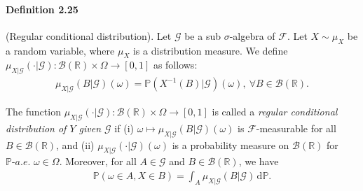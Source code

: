 \documentclass{article}
\numberwithin{equation}{section}
\renewcommand{\P}{\mathbb{P}}
\renewcommand{\d}{\mathrm{d}}
\theoremstyle{plain}
\theoremstyle{definition}
\begin{document}
\paragraph{Definition 2.25\label{def:2.25}} (Regular conditional distribution). Let $\mathscr{G}$ be a sub $\sigma$-algebra of $\mathscr{F}$. Let $X\sim\mu_X$ be a random variable, where $\mu_X$ is a distribution measure. We define $\mu_{X|\mathscr{G}}(\cdot|\mathscr{G}):\mathscr{B}(\mathbb{R})\times\Omega\to[0,1]$ as follows:
\begin{align*}
	\mu_{X|\mathscr{G}}(B|\mathscr{G})(\omega) = \P(X^{-1}(B)|\mathscr{G})(\omega),\ \forall B\in\mathscr{B}(\mathbb{R}).
\end{align*}

The function $\mu_{X|\mathscr{G}}(\cdot|\mathscr{G}):\mathscr{B}(\mathbb{R})\times\Omega\to[0,1]$ is called a \textit{regular conditional distribution of $Y$ given $\mathscr{G}$} if (i) $\omega\mapsto\mu_{X|\mathscr{G}}(B|\mathscr{G})(\omega)$ is $\mathscr{F}$-measurable for all $B\in\mathscr{B}(\mathbb{R})$, and (ii) $\mu_{X|\mathscr{G}}(\cdot|\mathscr{G})(\omega)$ is a probability measure on $\mathscr{B}(\mathbb{R})$ for $\P\textit{-a.e.}$ $\omega\in\Omega$. Moreover, for all $A\in\mathscr{G}$ and $B\in\mathscr{B}(\mathbb{R})$, we have
\begin{align*}
	\P(\omega\in A,X\in B)=\int_A \mu_{X|\mathscr{G}}(B|\mathscr{G})\,\d \P.
\end{align*}
\end{document}
